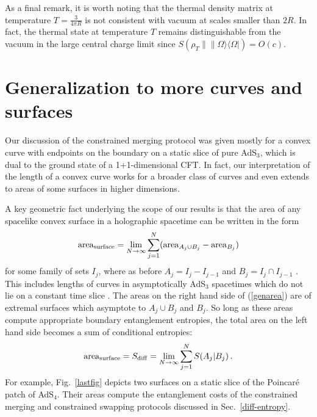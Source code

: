 \documentclass[12pt]{article}
\newcommand{\la}{\langle}
\newcommand{\ra}{\rangle}
\def\sdiff{S_{\rm diff}}
\begin{document}
As a final remark, it is worth noting that the thermal density matrix at temperature $T=\frac{3}{4\pi R}$ is not consistent with vacuum at scales smaller than $2R$. In fact, the thermal state at temperature $T$ remains distinguishable from the vacuum in the large central charge limit since $S(\rho_T\|\|\Omega\ra\la\Omega|)=O(c)$.

\section{Generalization to more curves and surfaces}
\label{disc}
Our discussion of the constrained merging protocol was given mostly for a convex curve with endpoints on the boundary on a static slice of pure AdS$_3$, which is dual to the ground state of a 1+1-dimensional CFT. In fact, our interpretation of the length of a convex curve works for a broader class of curves and even extends to areas of some surfaces in higher dimensions.

A key geometric fact underlying the scope of our results is that the area of any spacelike convex surface in a holographic spacetime can be written in the form
\begin{equation}
{\rm area}_{\rm surface} =
\lim_{N \to \infty} \sum_{j = 1}^N ({\rm area}_{A_j\cup B_j} - {\rm area}_{B_j})
\label{genarea}
\end{equation}
for some family of sets $I_j$, where as before $A_j = I_j - I_{j-1}$ and $B_j = I_j \cap I_{j-1}$  \cite{xi, robproof}.
This includes lengths of curves in asymptotically AdS$_3$ spacetimes which do not lie on a constant time slice \cite{robproof}. The areas on the right hand side of (\ref{genarea}) are of extremal surfaces which asymptote to $A_j \cup B_j$ and $B_j$. So long as these areas compute appropriate boundary entanglement entropies, the total area on the left hand side becomes a sum of conditional entropies:
\begin{equation}
{\rm area}_{\rm surface} =
\sdiff = \lim_{N \to \infty} \sum_{j = 1}^N S(A_j | B_j)\, .\label{genform}
\end{equation}
For example, Fig.~\ref{lastfig} depicts two surfaces on a static slice of the Poincar{\'e} patch of AdS$_4$. Their areas compute the entanglement costs of the constrained merging and constrained swapping protocols discussed in Sec.~\ref{diff-entropy}.
\end{document}
